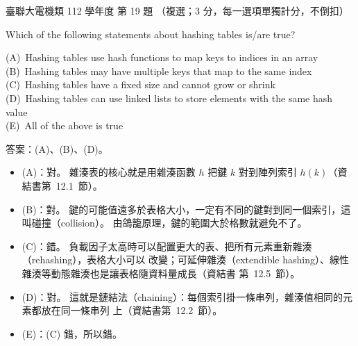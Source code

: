 \begin{pastexam}[label={px:ust-112-ee-ds-19}]{臺聯大電機類 112 學年度 第 19 題}
（複選；3 分，每一選項單獨計分，不倒扣）

Which of the following statements about hashing tables is/are true?

(A)~Hashing tables use hash functions to map keys to indices in an array\\
(B)~Hashing tables may have multiple keys that map to the same index\\
(C)~Hashing tables have a fixed size and cannot grow or shrink\\
(D)~Hashing tables can use linked lists to store elements with the same hash value\\
(E)~All of the above is true
\end{pastexam}

\begin{pastsoln}
答案：(A)、(B)、(D)。

\begin{itemize}
\item (A)：對。 雜湊表的核心就是用雜湊函數 $h$ 把鍵 $k$ 對到陣列索引 $h(k)$（資結書第~12.1~節）。
\item (B)：對。 鍵的可能值遠多於表格大小，一定有不同的鍵對到同一個索引，這叫碰撞（collision）。
由鴿籠原理，鍵的範圍大於格數就避免不了。
\item (C)：錯。 負載因子太高時可以配置更大的表、把所有元素重新雜湊（rehashing），表格大小可以
改變；可延伸雜湊（extendible hashing）、線性雜湊等動態雜湊也是讓表格隨資料量成長（資結書
第~12.5~節）。
\item (D)：對。 這就是鏈結法（chaining）：每個索引掛一條串列，雜湊值相同的元素都放在同一條串列
上（資結書第~12.2~節）。
\item (E)：(C) 錯，所以錯。
\end{itemize}
\end{pastsoln}
